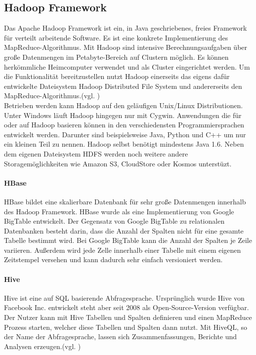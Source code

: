 \subsection{Hadoop Framework}
Das Apache Hadoop Framework ist ein, in Java geschriebenes, freies Framework für verteilt arbeitende Software. Es ist eine konkrete Implementierung des MapReduce-Algorithmus. Mit Hadoop sind intensive Berechnungsaufgaben über große Datenmengen im Petabyte-Bereich auf Clustern möglich. Es können herkömmliche Heimcomputer verwendet und als Cluster eingerichtet werden. Um die Funktionalität bereitzustellen nutzt Hadoop einerseits das eigens dafür entwickelte Dateisystem Hadoop Distributed File System und andererseits den MapReduce-Algorithmus.(vgl. \cite{wik16})\\ Betrieben werden kann Hadoop auf den geläufigen Unix/Linux Distributionen. Unter Windows läuft Hadoop hingegen nur mit Cygwin. Anwendungen die für oder auf Hadoop basieren können in den verschiedensten Programmiersprachen entwickelt werden. Darunter sind beispielsweise Java, Python und C++ um nur ein kleinen Teil zu nennen. Hadoop selbst benötigt mindestens Java 1.6. Neben dem eigenen Dateisystem HDFS werden noch weitere andere Storagemöglichkeiten wie Amazon S3, CloudStore oder Kosmos unterstüzt.

\paragraph{HBase}$\;$ \\
HBase bildet eine skalierbare Datenbank für sehr große Datenmengen innerhalb des Hadoop Framework. HBase wurde als eine Implementierung von Google BigTable entwickelt. Der Gegensatz von Google BigTable zu relationalen Datenbanken besteht darin, dass die Anzahl der Spalten nicht für eine gesamte Tabelle bestimmt wird. Bei Google BigTable kann die Anzahl der Spalten je Zeile variieren. Außerdem wird jede Zelle innerhalb einer Tabelle mit einem eigenen Zeitstempel versehen und kann dadurch sehr einfach versioniert werden.

\paragraph{Hive}$\;$ \\
Hive ist eine auf SQL basierende Abfragesprache. Ursprünglich wurde Hive von Facebook Inc. entwickelt steht aber seit 2008 als Open-Source-Version verfügbar. Der Nutzer kann mit Hive Tabellen und Spalten definieren und einen MapReduce Prozess starten, welcher diese Tabellen und Spalten dann nutzt. Mit HiveQL, so der Name der Abfragesprache, lassen sich Zusammenfassungen, Berichte und Analysen erzeugen.(vgl. \cite{bmc10})

